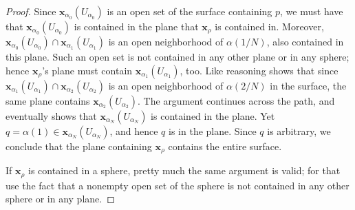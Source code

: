 \documentclass[leqno]{book}
\begin{document}
\begin{proof}
Since $\mathbf x_{\alpha_0}(U_{\alpha_0})$ is an open set of the surface containing $p$, we must have that $\mathbf x_{\alpha_0}(U_{\alpha_0})$ is contained in the plane that $\mathbf x_\rho$ is contained in.  Moreover, $\mathbf x_{\alpha_0}(U_{\alpha_0})\cap\mathbf x_{\alpha_1}(U_{\alpha_1})$ is an open neighborhood of $\alpha(1/N)$, also contained in this plane.  Such an open set is not contained in any other plane or in any sphere; hence $\mathbf x_\rho$'s plane must contain $\mathbf x_{\alpha_1}(U_{\alpha_1})$, too.  Like reasoning shows that since $\mathbf x_{\alpha_1}(U_{\alpha_1})\cap\mathbf x_{\alpha_2}(U_{\alpha_2})$ is an open neighborhood of $\alpha(2/N)$ in the surface, the same plane contains $\mathbf x_{\alpha_2}(U_{\alpha_2})$.  The argument continues across the path, and eventually shows that $\mathbf x_{\alpha_N}(U_{\alpha_N})$ is contained in the plane.  Yet $q=\alpha(1)\in\mathbf x_{\alpha_N}(U_{\alpha_N})$, and hence $q$ is in the plane.  Since $q$ is arbitrary, we conclude that the plane containing $\mathbf x_\rho$ contains the entire surface.

If $\mathbf x_\rho$ is contained in a sphere, pretty much the same argument is valid; for that use the fact that a nonempty open set of the sphere is not contained in any other sphere or in any plane.
\end{proof}
\end{document}
